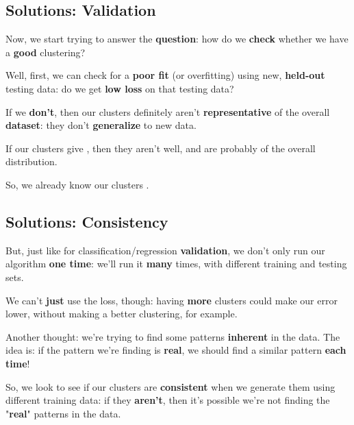 
    \subsection*{Solutions: Validation}
    
        Now, we start trying to answer the \textbf{question}: how do we \textbf{check} whether we have a \textbf{good} clustering?
        
        Well, first, we can check for a \textbf{poor fit} (or overfitting) using new, \textbf{held-out} testing data: do we get \textbf{low loss} on that testing data?
        
        If we \textbf{don't}, then our clusters definitely aren't \textbf{representative} of the overall \textbf{dataset}: they don't \textbf{generalize} to new data.\\
        
        \begin{concept}
            If our clusters give  , then they aren't  well, and are probably  of the overall distribution.
            
            So, we already know our clusters .
        \end{concept}
        
            
    \subsection*{Solutions: Consistency}
    
        But, just like for classification/regression \textbf{validation}, we don't only run our algorithm \textbf{one time}: we'll run it \textbf{many} times, with different training and testing sets.
        
        We can't \textbf{just} use the loss, though: having \textbf{more} clusters could make our error lower, without making a better clustering, for example.
        
        Another thought: we're trying to find some patterns \textbf{inherent} in the data. The idea is: if the pattern we're finding is \textbf{real}, we should find a similar pattern \textbf{each time}!
        
        So, we look to see if our clusters are \textbf{consistent} when we generate them using different training data: 
        if they \textbf{aren't}, then it's possible we're not finding the "\textbf{real}" patterns in the data.\\
        
